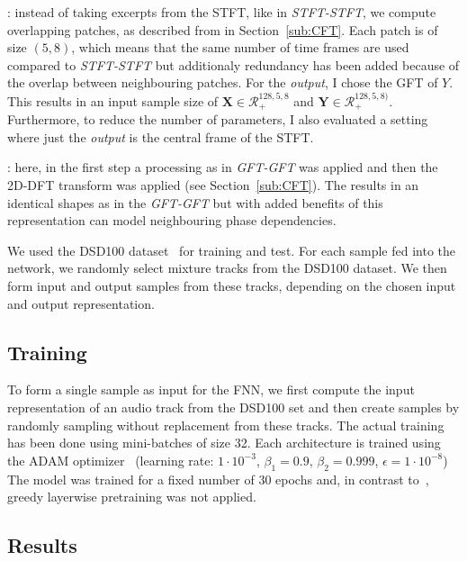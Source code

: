 {{\begin{description}[style=unboxed,leftmargin=0cm]
\item[GFT-GFT/GFT-STFT]: instead of taking excerpts from the STFT, like in \emph{STFT-STFT}, we compute overlapping patches, as described from in Section~\ref{sub:CFT}. Each patch is of size \((5, 8)\), which means that the same number of time frames are used compared to \emph{STFT-STFT} but additionaly redundancy has been added because of the overlap between neighbouring patches.
For the \emph{output}, I chose the GFT of \(Y\).
This results in an input sample size of \(\mathbf{X} \in \mathcal{R}_{+}^{128, 5, 8}\) and  \(\mathbf{Y} \in \mathcal{R}_{+}^{128, 5, 8)}\).
Furthermore, to reduce the number of parameters, I also evaluated a setting where just the \emph{output} is the central frame of the STFT.

\item[CFT-CFT/CFT-STFT]: here, in the first step a processing as in \emph{GFT-GFT} was applied and then the 2D-DFT transform was applied (see Section~\ref{sub:CFT}).
The results in an identical shapes as in the \emph{GFT-GFT} but with added benefits of this representation can model neighbouring phase dependencies.
\end{description}

We used the DSD100 dataset~\cite{ono15} for training and test. For each sample fed into the network, we randomly select mixture tracks from the DSD100 dataset.
We then form input and output samples from these tracks, depending on the chosen input and output representation.

\subsection{Training}

To form a single sample as input for the FNN, we first compute the input representation of an audio track from the DSD100 set and then create samples by randomly sampling without replacement from these tracks.
The actual training has been done using mini-batches of size 32.
Each architecture is trained using the ADAM optimizer~\cite{kingma14} (learning rate: \(1 \cdot 10^{-3}\), \(\beta_1=0.9\), \(\beta_2=0.999\), \(\epsilon=1 \cdot 10^{-8}\))
The model was trained for a fixed number of 30 epochs and, in contrast to~\cite{uhlich15}, greedy layerwise pretraining was not applied.

\subsection{Results}

}}
